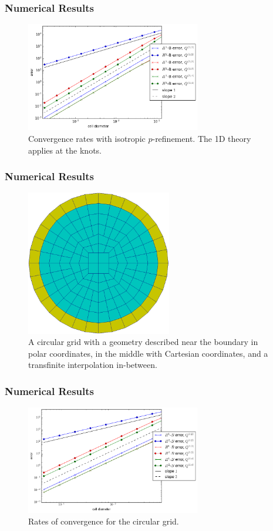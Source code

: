 \documentclass[8pt]{beamer}
\begin{document}
\begin{frame}
    \frametitle{Numerical Results}
    \begin{figure}
        \centering

        \includegraphics[width=3in]{Pictures/periodic-nonnormal-convergence.png}

        \caption{Convergence rates with isotropic \(p\)-refinement. The 1D
        theory applies at the knots.}
    \end{figure}
\end{frame}

\begin{frame}
    \frametitle{Numerical Results}
    \begin{figure}
        \centering

        \includegraphics[width=2.5in]{Pictures/circular-grid.png}
        \caption{A circular grid with a geometry described near the boundary in
        polar coordinates, in the middle with Cartesian coordinates, and a
        transfinite interpolation in-between.}
    \end{figure}
\end{frame}

\begin{frame}
    \frametitle{Numerical Results}
    \begin{figure}
        \centering

        \includegraphics[width=3in]{Pictures/circle-nonnormal-convergence.png}
        \caption{Rates of convergence for the circular grid.}
    \end{figure}
\end{frame}
\end{document}
